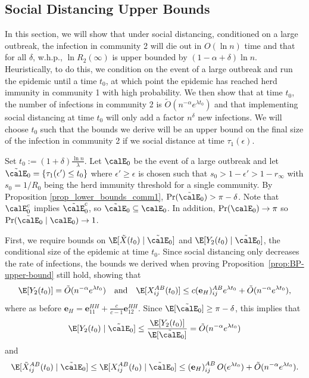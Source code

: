 \documentclass[11pt]{article}
\begin{document}
\subsection{Social Distancing Upper Bounds}
\label{sec;BP-socialdist-upper-bd}


In this section, we will show that under social distancing, conditioned on a large outbreak, the infection in community 2 will die out in $O(\ln n)$ time and that for all $\delta$, w.h.p.,  $\ln R_2(\infty)$ is upper bounded by $(1-\alpha+\delta)\ln n$. Heuristically, to do this, we condition on the event of a large outbreak and run the epidemic until a time $t_0$, at which point the epidemic has reached herd immunity in community 1 with high probability. We then show that at time $t_0$, the number of infections in community 2 is $\tilde O(n^{-\alpha}e^{\lambda t_0})$ and that implementing social distancing at time $t_0$ will only add a factor $n^\delta$ new infections. We will choose $t_0$ such that the bounds we derive will be an upper bound on the final size of the infection in community 2 if we social distance at time $\tau_1(\epsilon)$. 

Set $t_0 := (1+\delta) \frac{\ln n}{\lambda}$. Let $\calE_0$ be the event of a large outbreak and let $\tilde \calE_0 = \{\tau_1(\epsilon') \leq t_0\}$ where $\epsilon' \geq \epsilon$ is chosen such that $s_0 > 1-\epsilon' > 1- r_\infty$ with $s_0 = 1/R_0$ being the herd immunity threshold for a single community. By Proposition \ref{prop_lower_bounds_comm1}, $\Pr(\tilde \calE_0) > \pi- \delta$. Note that  $\calE_0^c$ implies $\tilde \calE_0^c$, so $\tilde \calE_0 \subseteq \calE_0$. In addition, $\Pr(\calE_{0}) \to \pi$ so
$\Pr(\tilde \calE_0 \mid \calE_0) \to 1$. 

First, we require bounds on $\E[\tilde X(t_0) \mid \tilde \calE_0]$ and $\E[Y_2(t_0) \mid \tilde \calE_0]$, the conditional size of the epidemic at time $t_0$. Since  social distancing only decreases the rate of infections, the bounds we derived when proving Proposition~\ref{prop:BP-upper-bound} still hold, showing  that 
\[
     \E[Y_2(t_0)] = \tilde O(n^{-\alpha}e^{\lambda t_0})\quad\text{and}\quad
        \E[X_{ij}^{AB}(t_0)] \leq c(\mathbf e_H)_{ij}^{AB} e^{\lambda t_0} + \tilde O(n^{-\alpha}e^{\lambda t_0}),
\]
where as before $\mathbf e_H={\mathbf e}_{11}^{HH}+\frac c{c-1}{\mathbf e}_{12}^{HH}$. Since $\E[\tilde\calE_0]\geq \pi-\delta$, this implies  that
\begin{equation}\label{eq:bnd-sd-y-2}
    \E[Y_2(t_0) \mid \tilde \calE_0] \leq \frac{ \E[Y_2(t_0)] }{\E[ \tilde \calE_0]}=
    \tilde O(n^{-\alpha} e^{\lambda t_0})
\end{equation}
and
\begin{equation}\label{eq:bnd-sd-tilde-x}
    \E[\tilde X_{ij}^{AB}(t_0) \mid \tilde\calE_0] \leq  \E[X_{ij}^{AB}(t_0) \mid \tilde\calE_0] \leq \left(\mathbf e_H\right)_{ij}^{AB}  O(e^{\lambda t_0}) + \tilde O(n^{-\alpha}e^{\lambda t_0}).
\end{equation}
\end{document}
